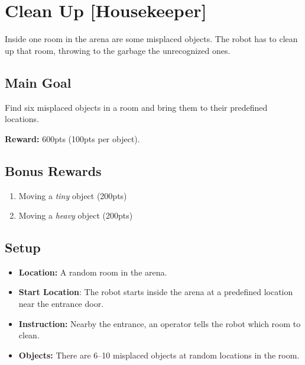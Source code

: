 \section{Clean Up [Housekeeper]}
\label{test:clean-up}
Inside one room in the arena are some misplaced objects. The robot has to clean up that room, throwing to the garbage the unrecognized ones.


\subsection*{Main Goal}
Find six misplaced objects in a room and bring them to their predefined locations.

\noindent\textbf{Reward:} 600pts (100pts per object).

\subsection*{Bonus Rewards}
\begin{enumerate}[nosep]
	\item Moving a \emph{tiny} object (200pts)
	\item Moving a \emph{heavy} object (200pts)
\end{enumerate}


\subsection*{Setup}
\begin{itemize}[nosep]
	\item \textbf{Location:} A random room in the arena.
	\item \textbf{Start Location}: The robot starts inside the arena at a predefined location near the entrance door.
	\item \textbf{Instruction:} Nearby the entrance, an operator tells the robot which room to clean.
	\item \textbf{Objects:} There are 6--10 misplaced objects at random locations in the room.
\end{itemize}

